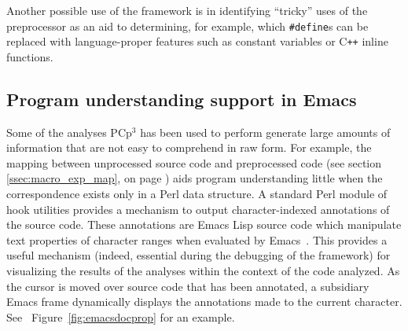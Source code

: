 \documentclass{article}
\newcommand{\pcp}{\mbox{\textsf{PCp}$^3$}}
\newcommand{\CPP}{\mbox{C\texttt{++}}}
\newcommand{\Perl}{\mbox{Perl}}
\newcommand{\ppd}[1]{\texttt{\##1}}
\newcommand{\sectionref}[1]{section \ref{#1}, on page \pageref{#1}}
\newcommand{\figref}[1]{Figure~\ref{#1}}
\begin{document}
Another possible use of the framework is in identifying ``tricky'' uses
of the preprocessor as an aid to determining, for example, which
\ppd{define}s can be replaced with language-proper features such as
constant variables or \CPP{} inline functions.

\subsection{Program understanding support in Emacs}
\label{ssec:prg_und_supp}
Some of the analyses \pcp{} has been used to perform generate large amounts of
information that are not easy to comprehend in raw form.  For example,
the mapping between unprocessed source code and preprocessed code 
(see \sectionref{ssec:macro_exp_map}) aids
program understanding little when the correspondence exists only in a
\Perl{} data structure.
A standard \Perl{} module of hook utilities provides a
mechanism to output character-indexed annotations of the source code.
These annotations are Emacs Lisp source code which manipulate text
properties of character ranges when evaluated by Emacs~\cite{GNUELisp}.  This
provides a useful mechanism (indeed, essential during the debugging of
the framework) for visualizing the results of the analyses within the
context of the code analyzed.  As the cursor is moved over source code
that has been annotated, a subsidiary Emacs frame dynamically displays
the annotations made to the current character. See
~\figref{fig:emacsdocprop} for an example.
\end{document}
